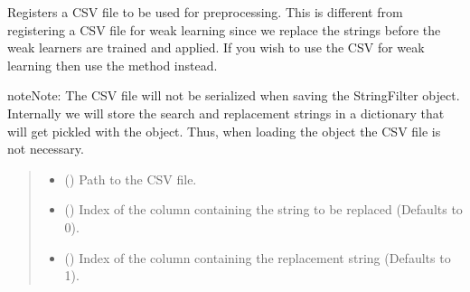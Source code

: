 \documentclass[letterpaper,10pt,english]{sphinxmanual}
\begin{document}
\begin{fulllineitems}
\begin{fulllineitems}
\label{\detokenize{preprocessor_stack:at_nlp.filters.preprocessor_stack.PreprocessorStack.add_csv_preprocessor}}
\pysigstartsignatures
{}
\pysigstopsignatures
\sphinxAtStartPar
Registers a CSV file to be used for preprocessing. This is different from
registering a CSV file for weak learning since we replace the strings
before the weak learners are trained and applied. If you wish to use the CSV
for weak learning then use the  method instead.

\begin{sphinxadmonition}{note}{Note:}
\sphinxAtStartPar
The CSV file will not be serialized when saving the StringFilter object.
Internally we will store the search and replacement strings in a dictionary
that will get pickled with the object. Thus, when loading the object the
CSV file is not necessary.
\end{sphinxadmonition}
\begin{quote}\begin{description}
\begin{itemize}
\item {} 
\sphinxAtStartPar
{} () \textendash{} Path to the CSV file.

\item {} 
\sphinxAtStartPar
{} () \textendash{} Index of the column containing the string to be replaced (Defaults to 0).

\item {} 
\sphinxAtStartPar
{} () \textendash{} Index of the column containing the replacement string (Defaults to 1).


\end{itemize}
\end{description}
\end{quote}
\end{fulllineitems}
\end{fulllineitems}
\end{document}
